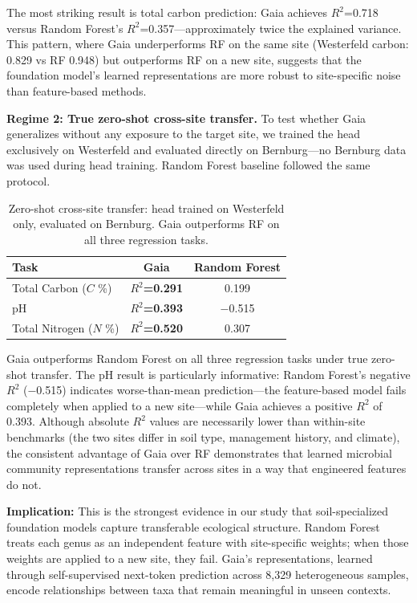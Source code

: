 \documentclass[11pt,a4paper]{article}
\begin{document}
The most striking result is total carbon prediction: Gaia achieves $R^2$=0.718 versus Random Forest's $R^2$=0.357---approximately twice the explained variance. This pattern, where Gaia underperforms RF on the same site (Westerfeld carbon: 0.829 vs RF 0.948) but outperforms RF on a new site, suggests that the foundation model's learned representations are more robust to site-specific noise than feature-based methods.

\textbf{Regime 2: True zero-shot cross-site transfer.} To test whether Gaia generalizes without any exposure to the target site, we trained the head exclusively on Westerfeld and evaluated directly on Bernburg---no Bernburg data was used during head training. Random Forest baseline followed the same protocol.

\begin{table}[H]
\centering
\caption{Zero-shot cross-site transfer: head trained on Westerfeld only, evaluated on Bernburg. Gaia outperforms RF on all three regression tasks.}
\label{tab:bernburg_zs}
\begin{tabular}{lcc}
\toprule
\textbf{Task} & \textbf{Gaia} & \textbf{Random Forest} \\
\midrule
Total Carbon ($C$ \%) & \textbf{$R^2$=0.291} & 0.199 \\
pH & \textbf{$R^2$=0.393} & $-$0.515 \\
Total Nitrogen ($N$ \%) & \textbf{$R^2$=0.520} & 0.307 \\
\bottomrule
\end{tabular}
\end{table}

Gaia outperforms Random Forest on all three regression tasks under true zero-shot transfer. The pH result is particularly informative: Random Forest's negative $R^2$ ($-$0.515) indicates worse-than-mean prediction---the feature-based model fails completely when applied to a new site---while Gaia achieves a positive $R^2$ of 0.393. Although absolute $R^2$ values are necessarily lower than within-site benchmarks (the two sites differ in soil type, management history, and climate), the consistent advantage of Gaia over RF demonstrates that learned microbial community representations transfer across sites in a way that engineered features do not.

\textbf{Implication:} This is the strongest evidence in our study that soil-specialized foundation models capture transferable ecological structure. Random Forest treats each genus as an independent feature with site-specific weights; when those weights are applied to a new site, they fail. Gaia's representations, learned through self-supervised next-token prediction across 8,329 heterogeneous samples, encode relationships between taxa that remain meaningful in unseen contexts.
\end{document}
